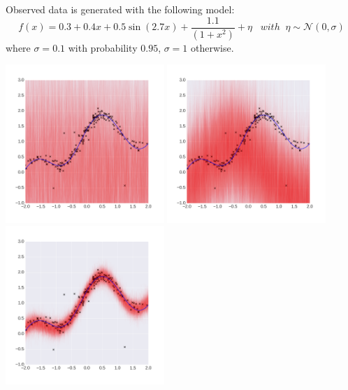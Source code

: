 \documentclass[a0,portrait]{a0poster}
\begin{document}
\begin{multicols}{2}
Observed data is generated with the following model: 
\begin{equation*}
f(x) =  0.3 + 0.4 x + 0.5 \sin(2.7x) + \frac{1.1}{(1+ x^2)} + \eta \;\;\; with\;\;\eta \sim \mathcal{N}(0,\sigma)
\end{equation*} where $\sigma = 0.1$ with probability $0.95$, $\sigma = 1$ otherwise.
\begin{center}
\includegraphics[width=6cm]{neal_se_1final.png}
\includegraphics[width=6cm]{neal_se_2final.png}
\includegraphics[width=6cm]{neal_se_3final.png}
\end{center}





\end{multicols}
\end{document}
